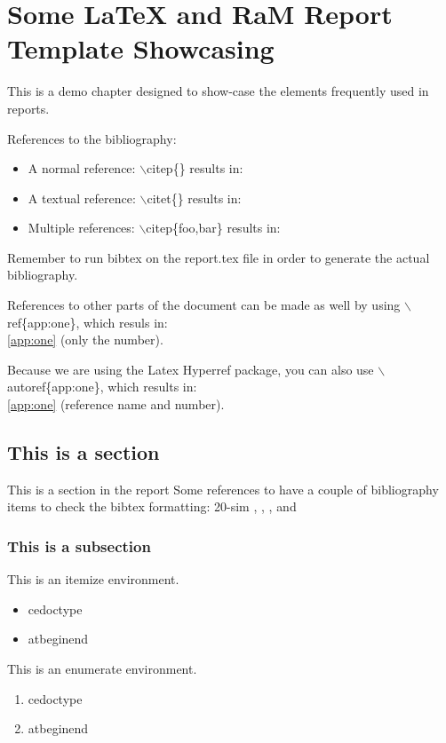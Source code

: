 \chapter{Some LaTeX and RaM Report Template Showcasing}
\label{ch:one}
This is a demo chapter designed to show-case the elements frequently used in reports.

References to the bibliography:

\begin{itemize}
	\item A normal reference:  $\backslash$citep\{\} results in: \citep{foo}
	\item A textual reference: $\backslash$citet\{\} results in: \citet{foo}
	\item Multiple references: $\backslash$citep\{foo,bar\}  results in:
	\citep{foo,bar}
\end{itemize}

Remember to run bibtex on the report.tex file in order to generate the actual
bibliography.

References to other parts of the document can be made as well by using
$\backslash$ref\{app:one\}, which resuls in:\\ \ref{app:one} (only the number).

Because we are using the Latex Hyperref package, you can also use $\backslash$autoref\{app:one\}, which results in:\\ \autoref{app:one} (reference name and number).

\section{This is a section}
This is a section in the report
Some references to have a couple of bibliography items to check the bibtex
formatting: 20-sim \citep{20sim}, \citep{DesignTraject}, \citep{CTlib},
\citep{gCSP} and \citep{Hoare}

\subsection{This is a subsection}
This is an itemize environment.

\begin{itemize}
	\item cedoctype	
	\item atbeginend
\end{itemize}

This is an enumerate environment.

\begin{enumerate}
	\item cedoctype	
	\item atbeginend
\end{enumerate}

